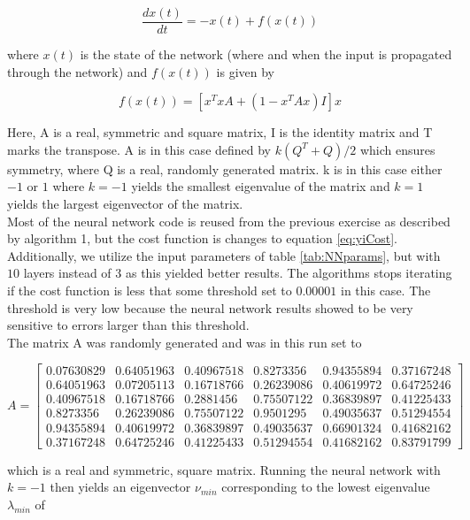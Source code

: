 \documentclass[12pt,a4paper]{article}
\begin{document}
\begin{equation}\label{eq:yiCost}
\frac{d x(t)}{dt} = -x(t) + f(x(t))
\end{equation}

\noindent where $x(t)$ is the state of the network (where and when the input is propagated through the network) and $f(x(t))$ is given by 

\begin{equation}\label{eq:fxt}
f(x(t)) = [x^TxA + (1-x^TAx)I]x
\end{equation}

\noindent Here, A is a real, symmetric and square matrix, I is the identity matrix and T marks the transpose. A is in this case defined by $k(Q^T + Q)/2$ which ensures symmetry, where Q is a real, randomly generated matrix. k is in this case either $-1$ or $1$ where $k = -1$ yields the smallest eigenvalue of the matrix and $k = 1$ yields the largest eigenvector of the matrix. 
\\
Most of the neural network code is reused from the previous exercise as described by algorithm 1, but the cost function is changes to equation \ref{eq:yiCost}. Additionally, we utilize the input parameters of table \ref{tab:NNparams}, but with $10$ layers instead of $3$ as this yielded better results. The algorithms stops iterating if the cost function is less that some threshold set to $0.00001$ in this case. The threshold is very low because the neural network results showed to be very sensitive to errors larger than this threshold.
\\
The matrix A was randomly generated and was in this run set to

\[
A=
  \begin{bmatrix}
    0.07630829 & 0.64051963 & 0.40967518 & 0.8273356 & 0.94355894 & 0.37167248 \\
    0.64051963 & 0.07205113 & 0.16718766 & 0.26239086 & 0.40619972 & 0.64725246 \\
    0.40967518 & 0.16718766 & 0.2881456 & 0.75507122 & 0.36839897 & 0.41225433 \\
    0.8273356 & 0.26239086 & 0.75507122 & 0.9501295 & 0.49035637 & 0.51294554 \\
    0.94355894 & 0.40619972 & 0.36839897 & 0.49035637 & 0.66901324 & 0.41682162 \\
    0.37167248 & 0.64725246 & 0.41225433 & 0.51294554 & 0.41682162 & 0.83791799 
  \end{bmatrix}
\]

\noindent which is a real and symmetric, square matrix. Running the neural network with $k = -1$ then yields an eigenvector $\nu_{min}$ corresponding to the lowest eigenvalue $\lambda_{min}$ of 
\end{document}
